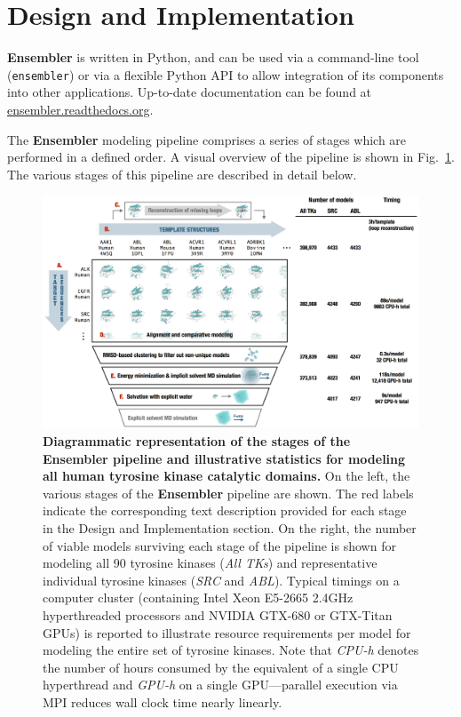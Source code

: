 \documentclass[aps,pre,twocolumn,nofootinbib,superscriptaddress,linenumbers]{revtex4-1}
\begin{document}
\section{Design and Implementation}

{\bf Ensembler} is written in Python, and can be used via a command-line tool ({\tt ensembler}) or via a flexible Python API to allow integration of its components into other applications.
Up-to-date documentation can be found at \href{http://ensembler.readthedocs.org/en/latest/}{ensembler.readthedocs.org}.

The {\bf Ensembler} modeling pipeline comprises a series of stages which are performed in a defined order. 
A visual overview of the pipeline is shown in Fig.~\ref{figure:pipeline}.
The various stages of this pipeline are described in detail below.

\begin{figure}[tb]
    \includegraphics[width=1.0\textwidth]{pipeline/pipeline2}

  \caption{{\bf Diagrammatic representation of the stages of the Ensembler pipeline and illustrative statistics for modeling all human tyrosine kinase catalytic domains.}
  On the left, the various stages of the {\bf Ensembler} pipeline are shown.
  The red labels indicate the corresponding text description provided for each stage in the Design and Implementation section.
  On the right, the number of viable models surviving each stage of the pipeline is shown for modeling all 90 tyrosine kinases (\emph{All TKs}) and representative individual tyrosine kinases (\emph{SRC} and \emph{ABL}).
  Typical timings on a computer cluster (containing Intel Xeon E5-2665 2.4GHz hyperthreaded processors and NVIDIA GTX-680 or GTX-Titan GPUs) is reported to illustrate resource requirements per model for modeling the entire set of tyrosine kinases.
  Note that \emph{CPU-h} denotes the number of hours consumed by the equivalent of a single CPU hyperthread and \emph{GPU-h} on a single GPU---parallel execution via MPI reduces wall clock time nearly linearly.
  }
  \label{figure:pipeline}
\end{figure}
\end{document}
